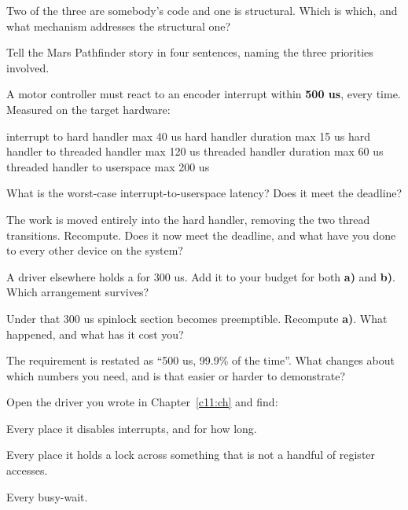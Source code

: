  Two of the three are somebody's code and one is structural. Which is which, and what
mechanism addresses the structural one?

 Tell the Mars Pathfinder story in four sentences, naming the three priorities involved.

\label{c12:ex:3}

A motor controller must react to an encoder interrupt within \textbf{500 us}, every time. Measured
on the target hardware:

\begin{console}
interrupt to hard handler        max  40 us
hard handler duration            max  15 us
hard handler to threaded handler max 120 us
threaded handler duration        max  60 us
threaded handler to userspace    max 200 us
\end{console}

 What is the worst-case interrupt-to-userspace latency? Does it meet the deadline?

 The work is moved entirely into the hard handler, removing the two thread transitions.
Recompute. Does it now meet the deadline, and what have you done to every other device on the
system?

 A driver elsewhere holds a  for 300 us. Add it to your budget for both
\textbf{a)} and \textbf{b)}. Which arrangement survives?

 Under  that 300 us spinlock section becomes preemptible. Recompute
\textbf{a)}. What happened, and what has it cost you?

 The requirement is restated as ``500 us, 99.9\% of the time''. What changes about which
numbers you need, and is that easier or harder to demonstrate?

\label{c12:ex:4}

Open the driver you wrote in Chapter~\ref{c11:ch} and find:

 Every place it disables interrupts, and for how long.

 Every place it holds a lock across something that is not a handful of register accesses.

 Every busy-wait.

